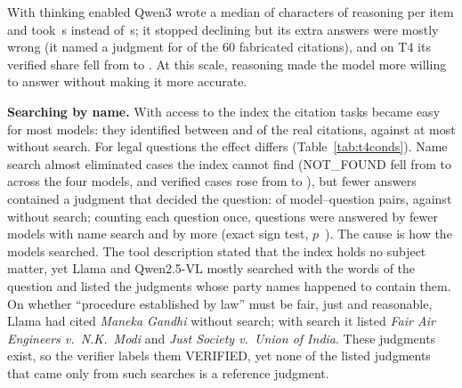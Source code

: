 \documentclass[conference]{IEEEtran}
\begin{document}
\begin{table}[t]
\caption{T5: the T4 answers that contained an unverified case (Q), before and after the model revised them with the verifier's feedback.}
\label{tab:t5}
\centering
\footnotesize
\setlength{\tabcolsep}{3.5pt}

\end{table}

With thinking enabled Qwen3 wrote a median of \ThinkMedianChars{} characters of reasoning per item and took \ThinkMedianSec{}\,s instead of \NoThinkMedianSec{}\,s; it stopped declining but its extra answers were mostly wrong (it named a judgment for \ThinkTTwoNamed{} of the 60 fabricated citations), and on T4 its verified share fell from \NoThinkTFourVerPct{} to \ThinkTFourVerPct. At this scale, reasoning made the model more willing to answer without making it more accurate.

\textbf{Searching by name.} With access to the index the citation tasks became easy for most models: they identified between \SearchTOneCorrectMin{} and \SearchTOneCorrectMax{} of the \TOneN{} real citations, against at most \BestTOneCorrect{} without search. For legal questions the effect differs (Table~\ref{tab:t4conds}). Name search almost eliminated cases the index cannot find (NOT\_FOUND fell from \NFClosedAll{} to \NFSearchAll{} across the four models, and verified cases rose from \VerClosedAll{} to \VerSearchAll{}), but fewer answers contained a judgment that decided the question: \RefSearchAll{} of \RefQuestionsAll{} model--question pairs, against \RefClosedAll{} without search; counting each question once, \SignClosedNameWorse{} questions were answered by fewer models with name search and \SignClosedNameBetter{} by more (exact sign test, $p$~\SignClosedNameP). The cause is how the models searched. The tool description stated that the index holds no subject matter, yet Llama and Qwen2.5-VL mostly searched with the words of the question and listed the judgments whose party names happened to contain them. On whether ``procedure established by law'' must be fair, just and reasonable, Llama had cited \emph{Maneka Gandhi} without search; with search it listed \emph{Fair Air Engineers v.\ N.K.\ Modi} and \emph{Just Society v.\ Union of India}. These judgments exist, so the verifier labels them VERIFIED, yet none of the \SearchTopicCasesAll{} listed judgments that came only from such searches is a reference judgment.

\begin{table}[t]
\caption{T4 under five conditions: from memory, after verifier feedback (T5 answers where revised, T4 otherwise), with name search over the index metadata, and with topic search over headnotes without and with the citation prior. Ref.\ = questions (of \NumTopics) whose list includes a judgment that decided the question; N.F.\ = listed cases the verifier could not find.}
\label{tab:t4conds}
\centering
\footnotesize
\setlength{\tabcolsep}{4pt}

\end{table}
\end{document}
